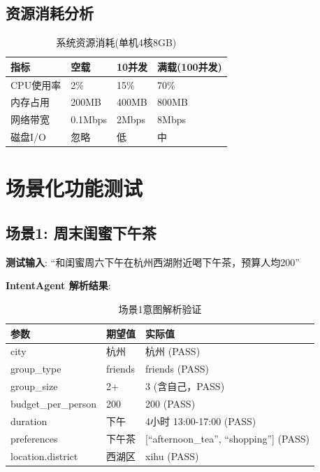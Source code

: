 \documentclass[12pt,a4paper]{ctexart}
\begin{document}
\subsection{资源消耗分析}

\begin{table}[H]
\centering
\caption{系统资源消耗(单机4核8GB)}
\label{tab:resource-usage}
\renewcommand{\arraystretch}{1.3}
\begin{tabularx}{\textwidth}{lXXX}
\toprule
\textbf{指标} & \textbf{空载} & \textbf{10并发} & \textbf{满载(100并发)} \\
\midrule
CPU使用率 & 2\% & 15\% & 70\% \\
内存占用 & 200MB & 400MB & 800MB \\
网络带宽 & 0.1Mbps & 2Mbps & 8Mbps \\
磁盘I/O & 忽略 & 低 & 中 \\
\bottomrule
\end{tabularx}
\end{table}

\section{场景化功能测试}

\subsection{场景1: 周末闺蜜下午茶}

\textbf{测试输入}: ``和闺蜜周六下午在杭州西湖附近喝下午茶，预算人均200''

\textbf{IntentAgent 解析结果}:
\begin{table}[H]
\centering
\caption{场景1意图解析验证}
\begin{tabularx}{\textwidth}{llX}
\toprule
\textbf{参数} & \textbf{期望值} & \textbf{实际值} \\
\midrule
city & 杭州 & 杭州 (PASS) \\
group\_type & friends & friends (PASS) \\
group\_size & 2+ & 3 (含自己，PASS) \\
budget\_per\_person & 200 & 200 (PASS) \\
duration & 下午 & 4小时 13:00-17:00 (PASS) \\
preferences & 下午茶 & [``afternoon\_tea'', ``shopping''] (PASS) \\
location.district & 西湖区 & xihu (PASS) \\
\bottomrule
\end{tabularx}
\end{table}
\end{document}
